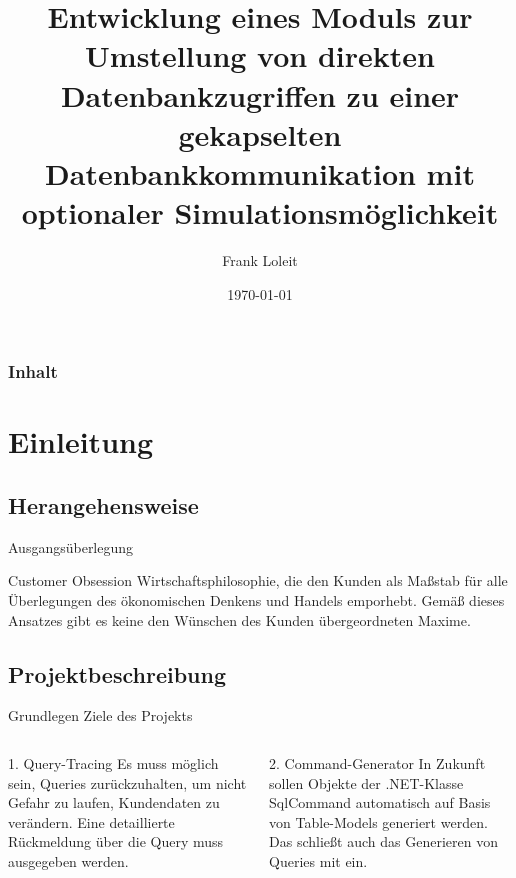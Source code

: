 \documentclass[toc]{beamer}
\title{Entwicklung eines Moduls zur Umstellung von direkten Datenbankzugriffen zu einer gekapselten Datenbankkommunikation mit optionaler Simulationsmöglichkeit}
\author{Frank Loleit}
\institute{Fachinformatiker (Anwendungsentwicklung)}
\date{\today}
\begin{document}
\begin{frame}
\titlepage
\end{frame}

\begin{frame}
    \frametitle{Inhalt}
    \tableofcontents
\end{frame}

\section{Einleitung}
    \subsection{Herangehensweise}
        \begin{frame}{Ausgangsüberlegung}
            \begin{block}{Customer Obsession}
                    Wirtschaftsphilosophie, die den Kunden als Maßstab für alle Überlegungen
                    des ökonomischen Denkens und Handels emporhebt. Gemäß dieses Ansatzes gibt es keine den Wünschen des Kunden übergeordneten Maxime.
            \end{block}
        \end{frame}
        
    \subsection{Projektbeschreibung}
        \begin{frame}{Grundlegen Ziele des Projekts}
                \begin{columns}
                        \begin{block}{1. Query-Tracing}
                            Es muss möglich sein, Queries zurückzuhalten, um nicht Gefahr zu laufen, Kundendaten zu verändern. Eine detaillierte Rückmeldung über die Query muss ausgegeben werden.
                        \end{block}
                        \begin{block}{2. Command-Generator}
                            In Zukunft sollen Objekte der .NET-Klasse \glqq SqlCommand\grqq{} automatisch auf Basis von Table-Models generiert werden. Das schließt auch das Generieren von Queries mit ein.
                        \end{block}
                \end{columns}
        \end{frame}
\end{document}
